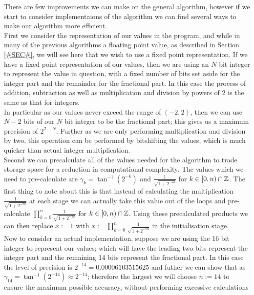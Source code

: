 {There are few improvements we can make on the general algorithm, however if we start to consider implementaions of the algorithm we can find several ways to make our algorithm more efficient.\\

First we consider the representation of our values in the program, and while in many of the previous algorithms a floating point  value, as described in Section \ref{#SEC#}, we will see here that we wish to use a fixed point representation. If we have a fixed point representation of our values, then we are using an \(N\) bit integer to represent the value in question, with a fixed number of bits set aside for the integer part and the remainder for the fractional part. In this case the process of addition, subtraction as well as multiplication and division by powers of 2 is the same as that for integers.\\

In particular as our values never exceed the range of \((-2,2)\), then we can use \(N-2\) bits of our \(N\) bit integer to be the fractional part; this gives us a maximum precision of \(2^{2-N}\). Further as we are only performing multiplication and division by two, this operation can be performed by bitshifting the values, which is much quicker than actual integer multiplication.\\

Second we can precalculate all of the values needed for the algorithm to trade storage space for a reduction in computational complexity. The values which we need to pre-calculate are \(\gamma_k = \tan^{-1}(2^{-k})\) and \(\tfrac{1}{\sqrt{1+2^{-2k}}}\) for \(k \in [0, n) \cap \mathbb{Z}\). The first thing to note about this is that instead of calculating the multiplication \(\tfrac{1}{\sqrt{1+2^{-2k}}}\) at each stage we can actually take this value out of the loops and pre-calculate \(\prod_{k=0}^n \tfrac{1}{\sqrt{1+2^{-2k}}}\) for \(k \in [0, n) \cap \mathbb{Z}\). Using these precalculated products we can then replace \(x := 1\) with \(x := \prod_{k=0}^n \tfrac{1}{\sqrt{1+2^{-2k}}}\) in the initialisation stage.\\

Now to consider an actual implementation, suppose we are using the 16 bit integer  to represent our values; which will have the leading two bits represent the integer part and the remaining 14 bits represent the fractional part. In this case the level of precision is \(2^{-14} = 0.00006103515625\) and futher we can show that as \(\gamma_{14} = \tan^{-1}(2^{-14}) \approx 2^{-14}\); therefore the largest we will choose \(n := 14\) to ensure the maximum possible accuracy, without performing excessive calculations\\

}
